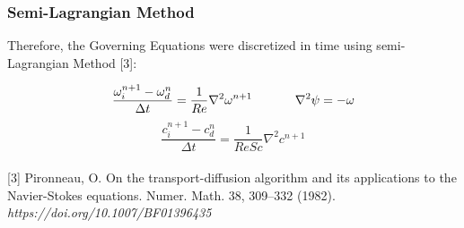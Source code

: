 
\begin{frame} 
 \frametitle{\LARGE Semi-Lagrangian Method}
Therefore, the Governing Equations were discretized in time using semi-Lagrangian Method [3]:

\vspace{1.5cm}
\begin{equation*}
 \frac{\omega_{i}^{n+1} - \omega_{d}^{n}}{\Delta t} = \frac{1}{Re} \nabla^{2} \omega^{n+1}
 \hspace{1.2cm}
 \nabla^{2} \psi = - \omega
\end{equation*}
\vspace{0.2cm}
\begin{equation*}
 \frac{c_{i}^{n+1} - c_{d}^{n}}{\Delta t} = \frac{1}{ReSc} \nabla^{2} c^{n+1}
\end{equation*}\\[0.8cm]

\justifying
\vspace{1cm}
\tiny [3]
Pironneau, O. On the transport-diffusion algorithm and its applications to the Navier-Stokes equations. Numer. Math. 38, 309–332 (1982). \textit{https://doi.org/10.1007/BF01396435}
\end{frame}






